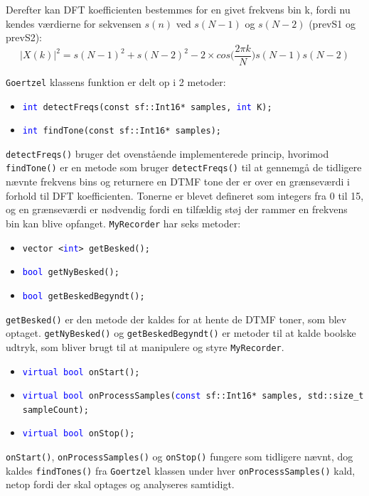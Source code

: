 \newline
Derefter kan DFT koefficienten bestemmes for en givet frekvens bin k, fordi nu kendes værdierne for sekvensen $s(n)$ ved $s(N-1)$ og $s(N-2)$ (prevS1 og prevS2):
\begin{equation}
|X(k)|^2 = s(N-1)^2 + s(N-2)^2 - 2 \times cos\bigg(\frac{2 \pi k}{N}\bigg) s(N-1)s(N-2) \label{eq:DFTk}
\end{equation}

\texttt{Goertzel} klassens funktion er delt op i 2 metoder:
\begin{itemize}
	\item \texttt{\textcolor{blue}{int} detectFreqs(const sf::\textcolor{dkgreen}{Int16*} samples, \textcolor{blue}{int} K);}
	
	\item \texttt{\textcolor{blue}{int} findTone(const sf::\textcolor{dkgreen}{Int16*} samples);}
\end{itemize}
\texttt{detectFreqs()} bruger det ovenstående implementerede princip, hvorimod \texttt{findTone()} er en metode som bruger \texttt{detectFreqs()} til at gennemgå de tidligere nævnte frekvens bins og returnere en DTMF tone der er over en grænseværdi i forhold til DFT koefficienten. Tonerne er blevet defineret som integers fra 0 til 15, og en grænseværdi er nødvendig fordi en tilfældig støj der rammer en frekvens bin kan blive opfanget.
\newline
\texttt{MyRecorder} har seks metoder:
\begin{itemize}
	\item \texttt{\textcolor{dkgreen}{vector} <\textcolor{blue}{int}> getBesked();}
	
	\item \texttt{\textcolor{blue}{bool} getNyBesked();}
	
	\item \texttt{\textcolor{blue}{bool} getBeskedBegyndt();}
\end{itemize}
\texttt{getBesked()} er den metode der kaldes for at hente de DTMF toner, som blev optaget.
\newline
\texttt{getNyBesked()} og \texttt{getBeskedBegyndt()} er metoder til at kalde boolske udtryk, som bliver brugt til at manipulere og styre \texttt{MyRecorder}.
\begin{itemize}
	\item \texttt{\textcolor{blue}{virtual bool} onStart();}
	
	\item \texttt{\textcolor{blue}{virtual bool} onProcessSamples(\textcolor{blue}{const} sf::\textcolor{dkgreen}{Int16*} samples, std::\textcolor{dkgreen}{size\_t} sampleCount);}
	
	\item \texttt{\textcolor{blue}{virtual bool} onStop();}
\end{itemize}
\texttt{onStart()}, \texttt{onProcessSamples()} og \texttt{onStop()} fungere som tidligere nævnt, dog kaldes \texttt{findTones()} fra \texttt{Goertzel} klassen under hver \texttt{onProcessSamples()} kald, netop fordi der skal optages og analyseres samtidigt.
\hfill \break

